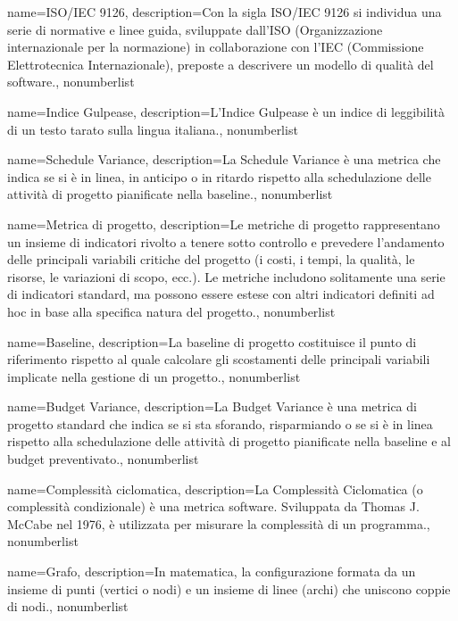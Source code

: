 {
	name={ISO/IEC 9126},
	description={Con la sigla ISO/IEC 9126 si individua una serie di normative e linee guida, sviluppate dall'ISO (Organizzazione internazionale per la normazione) in collaborazione con l'IEC (Commissione Elettrotecnica Internazionale), preposte a descrivere un modello di qualità del software.}, 
	nonumberlist 
}

{
	name={Indice Gulpease},
	description={L'Indice Gulpease è un indice di leggibilità di un testo tarato sulla lingua italiana.}, 
	nonumberlist 
}

{
	name={Schedule Variance},
	description={La Schedule Variance è una metrica che indica se si è in linea, in anticipo o in ritardo rispetto alla schedulazione delle attività di progetto pianificate nella baseline.}, 
	nonumberlist 
}

{
	name={Metrica di progetto},
	description={Le metriche di progetto rappresentano un insieme di indicatori rivolto a tenere sotto controllo e prevedere l'andamento delle principali variabili critiche del progetto (i costi, i tempi, la qualità, le risorse, le variazioni di scopo, ecc.). Le metriche includono solitamente una serie di indicatori standard, ma possono essere estese con altri indicatori definiti ad hoc in base alla specifica natura del progetto.}, 
	nonumberlist 
}

{
	name={Baseline},
	description={La baseline di progetto costituisce il punto di riferimento rispetto al quale calcolare gli scostamenti delle principali variabili implicate nella gestione di un progetto.}, 
	nonumberlist 
}

{
	name={Budget Variance},
	description={La Budget Variance è una metrica di progetto standard che indica se si sta sforando, risparmiando o se si è in linea rispetto alla schedulazione delle attività di progetto pianificate nella baseline e al budget preventivato.}, 
	nonumberlist 
}

{
	name={Complessità ciclomatica},
	description={La Complessità Ciclomatica (o complessità condizionale) è una metrica software. Sviluppata da Thomas J. McCabe nel 1976, è utilizzata per misurare la complessità di un programma.}, 
	nonumberlist 
}

{
	name={Grafo},
	description={In matematica, la configurazione formata da un insieme di punti (vertici o nodi) e un insieme di linee (archi) che uniscono coppie di nodi.}, 
	nonumberlist 
}

